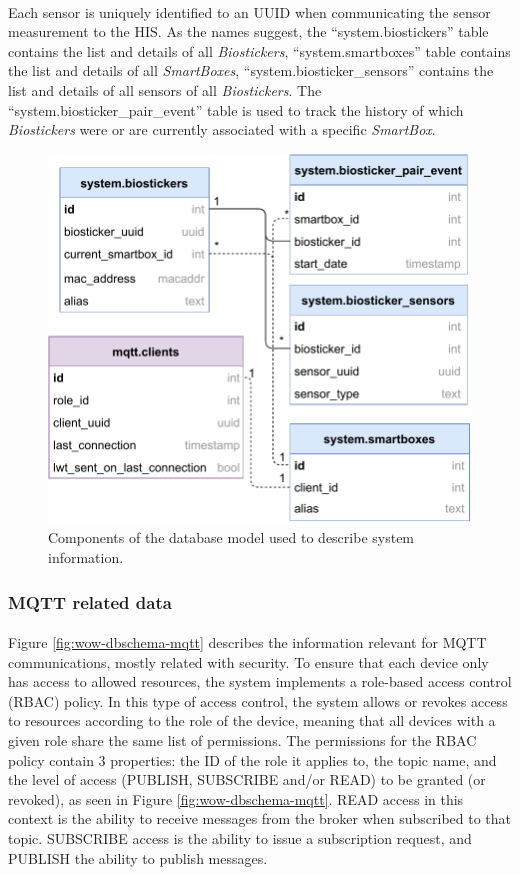 \paragraph{} Each sensor is uniquely identified to an \acs{UUID} when communicating the sensor measurement to the \acs{HIS}. As the names suggest, the ``system.biostickers'' table contains the list and details of all \textit{Biostickers}, ``system.smartboxes'' table contains the list and details of all \textit{SmartBoxes}, ``system.biosticker\_sensors'' contains the list and details of all sensors of all \textit{Biostickers}. The ``system.biosticker\_pair\_event'' table is used to track the history of which \textit{Biostickers} were or are currently associated with a specific \textit{SmartBox}.

\begin{figure}[H]
    \centering
    \includegraphics[width=0.55\linewidth]{images/database-schema-system.pdf}
    \caption{
    Components of the database model used to describe system information.}
    \label{fig:wow-dbschema-system}
\end{figure}

\subsubsection{MQTT related data}

\paragraph{} Figure \ref{fig:wow-dbschema-mqtt} describes the information relevant for \acs{MQTT} communications, mostly related with security. To ensure that each device only has access to allowed resources, the system implements a role-based access control (\acs{RBAC}) policy. 
In this type of access control, the system allows or revokes access to resources according to the role of the device, meaning that all devices with a given role share the same list of permissions. The permissions for the \acs{RBAC} policy contain 3 properties: the ID of the role it applies to, the topic name, and the level of access (PUBLISH, SUBSCRIBE and/or READ) to be granted (or revoked), as seen in Figure \ref{fig:wow-dbschema-mqtt}. READ access in this context is the ability to receive messages from the broker when subscribed to that topic. SUBSCRIBE access is the ability to issue a subscription request, and PUBLISH the ability to publish messages.

